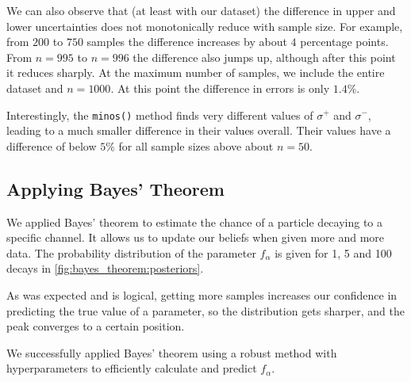 We can also observe that (at least with our dataset) the difference in upper and lower uncertainties does not monotonically reduce with sample size. For example, from $200$ to $750$ samples the difference increases by about $4$ percentage points. From $n = 995$ to $n = 996$ the difference also jumps up, although after this point it reduces sharply. At the maximum number of samples, we include the entire dataset and $n = 1000$. At this point the difference in errors is only $1.4 \%$.

Interestingly, the \texttt{minos()} method finds very different values of $\sigma^+$ and $\sigma^-$, leading to a much smaller difference in their values overall. Their values have a difference of below $5 \%$ for all sample sizes above about $n = 50$.


\subsection{Applying Bayes' Theorem}

We applied Bayes' theorem to estimate the chance of a particle decaying to a specific channel. It allows us to update our beliefs when given more and more data. The probability distribution of the parameter $f_\alpha$ is given for 1, 5 and 100 decays in \autoref{fig:bayes_theorem:posteriors}.

As was expected and is logical, getting more samples increases our confidence in predicting the true value of a parameter, so the distribution gets sharper, and the peak converges to a certain position.

We successfully applied Bayes' theorem using a robust method with hyperparameters to efficiently calculate and predict \( f_\alpha \).

